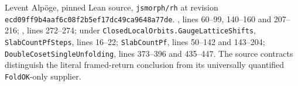 Levent Alp\"oge, pinned Lean source,
\texttt{jsmorph/rh} at revision
\texttt{ecd09ff9b4aaf6c08f2b5ef17dc49ca9648a77de}.
,
lines 60--99, 140--160 and 207--216;
,
lines 272--274;
under \texttt{ClosedLocalOrbits.GaugeLatticeShifts},
\texttt{SlabCountPfSteps}, lines 16--22;
\texttt{SlabCountPf}, lines 50--142 and 143--204;
\texttt{DoubleCosetSingleUnfolding}, lines 373--396 and 435--447.
The source contracts distinguish the literal framed-return conclusion
from its universally quantified \texttt{FoldOK}-only supplier.
